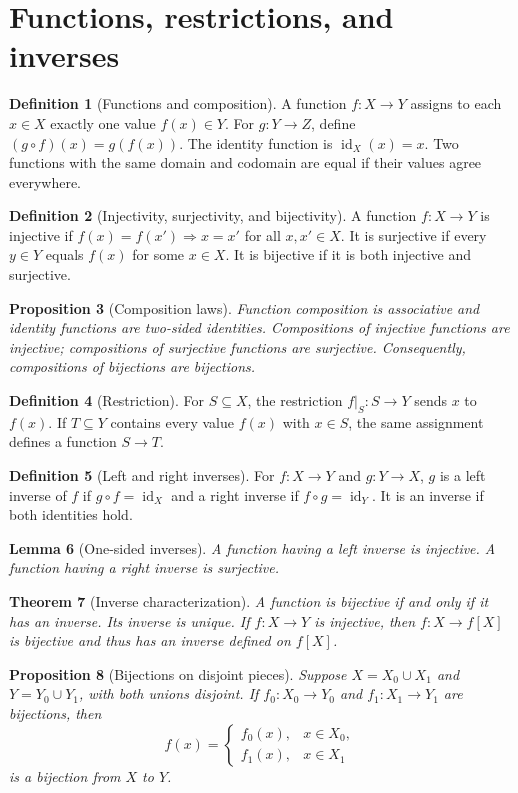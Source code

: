 \documentclass[11pt]{article}
\newtheorem{theorem}{Theorem}[section]
\newtheorem{lemma}[theorem]{Lemma}
\newtheorem{proposition}[theorem]{Proposition}
\theoremstyle{definition}
\newtheorem{definition}[theorem]{Definition}
\newcommand{\id}{\operatorname{id}}
\begin{document}
\section{Functions, restrictions, and inverses}
\begin{definition}[Functions and composition]
A function $f:X\to Y$ assigns to each $x\in X$ exactly one value $f(x)\in Y$.
For $g:Y\to Z$, define $(g\circ f)(x)=g(f(x))$.
The identity function is $\id_X(x)=x$.
Two functions with the same domain and codomain are equal if their values agree everywhere.
\end{definition}
\begin{definition}[Injectivity, surjectivity, and bijectivity]
A function $f:X\to Y$ is injective if
$f(x)=f(x')\Rightarrow x=x'$ for all $x,x'\in X$.
It is surjective if every $y\in Y$ equals $f(x)$ for some $x\in X$.
It is bijective if it is both injective and surjective.
\end{definition}
\begin{proposition}[Composition laws]
Function composition is associative and identity functions are two-sided
identities. Compositions of injective functions are injective;
compositions of surjective functions are surjective. Consequently,
compositions of bijections are bijections.
\end{proposition}
\begin{definition}[Restriction]
For $S\subseteq X$, the restriction $f|_S:S\to Y$ sends $x$ to $f(x)$.
If $T\subseteq Y$ contains every value $f(x)$ with $x\in S$, the same
assignment defines a function $S\to T$.
\end{definition}
\begin{definition}[Left and right inverses]
For $f:X\to Y$ and $g:Y\to X$, $g$ is a left inverse of $f$ if
$g\circ f=\id_X$ and a right inverse if $f\circ g=\id_Y$.
It is an inverse if both identities hold.
\end{definition}
\begin{lemma}[One-sided inverses]
A function having a left inverse is injective. A function having a
right inverse is surjective.
\end{lemma}
\begin{theorem}[Inverse characterization]
A function is bijective if and only if it has an inverse. Its inverse
is unique. If $f:X\to Y$ is injective, then
$f:X\to f[X]$ is bijective and thus has an inverse defined on $f[X]$.
\end{theorem}
\begin{proposition}[Bijections on disjoint pieces]
Suppose $X=X_0\cup X_1$ and $Y=Y_0\cup Y_1$, with both unions disjoint.
If $f_0:X_0\to Y_0$ and $f_1:X_1\to Y_1$ are bijections, then
\[
f(x)=\begin{cases}f_0(x),&x\in X_0,\\f_1(x),&x\in X_1\end{cases}
\]
is a bijection from $X$ to $Y$.
\end{proposition}
\end{document}
